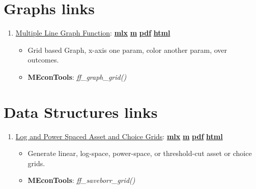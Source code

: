 \documentclass[
]{book}
\providecommand{\tightlist}{%
  \setlength{\itemsep}{0pt}\setlength{\parskip}{0pt}}
\begin{document}
\hypertarget{graphs-links}{%
\section{Graphs links}\label{graphs-links}}

\begin{enumerate}
\def\labelenumi{\arabic{enumi}.}
\tightlist
\item
  \href{https://fanwangecon.github.io/MEconTools/MEconTools/doc/graph/htmlpdfm/fx_graph_grid.html}{Multiple Line Graph Function}: \href{https://github.com/FanWangEcon/MEconTools/blob/master/MEconTools/doc/graph/fx_graph_grid.mlx}{\textbf{mlx}} \textbar{} \href{https://github.com/FanWangEcon/MEconTools/blob/master/MEconTools/doc/graph/htmlpdfm/fx_graph_grid.m}{\textbf{m}} \textbar{} \href{https://github.com/FanWangEcon/MEconTools/blob/master/MEconTools/doc/graph/htmlpdfm/fx_graph_grid.pdf}{\textbf{pdf}} \textbar{} \href{https://fanwangecon.github.io/MEconTools/MEconTools/doc/graph/htmlpdfm/fx_graph_grid.html}{\textbf{html}}

  \begin{itemize}
  \tightlist
  \item
    Grid based Graph, x-axis one param, color another param, over outcomes.
  \item
    \textbf{MEconTools}: \emph{ff\_graph\_grid()}
  \end{itemize}
\end{enumerate}

\hypertarget{data-structures-links}{%
\section{Data Structures links}\label{data-structures-links}}

\begin{enumerate}
\def\labelenumi{\arabic{enumi}.}
\tightlist
\item
  \href{https://fanwangecon.github.io/MEconTools/MEconTools/doc/generate/htmlpdfm/fx_saveborr_grid.html}{Log and Power Spaced Asset and Choice Grids}: \href{https://github.com/FanWangEcon/MEconTools/blob/master/MEconTools/doc/generate/fx_saveborr_grid.mlx}{\textbf{mlx}} \textbar{} \href{https://github.com/FanWangEcon/MEconTools/blob/master/MEconTools/doc/generate/htmlpdfm/fx_saveborr_grid.m}{\textbf{m}} \textbar{} \href{https://github.com/FanWangEcon/MEconTools/blob/master/MEconTools/doc/generate/htmlpdfm/fx_saveborr_grid.pdf}{\textbf{pdf}} \textbar{} \href{https://fanwangecon.github.io/MEconTools/MEconTools/doc/generate/htmlpdfm/fx_saveborr_grid.html}{\textbf{html}}

  \begin{itemize}
  \tightlist
  \item
    Generate linear, log-space, power-space, or threshold-cut asset or choice grids.
  \item
    \textbf{MEconTools}: \emph{ff\_saveborr\_grid()}
  \end{itemize}
\end{enumerate}
\end{document}
